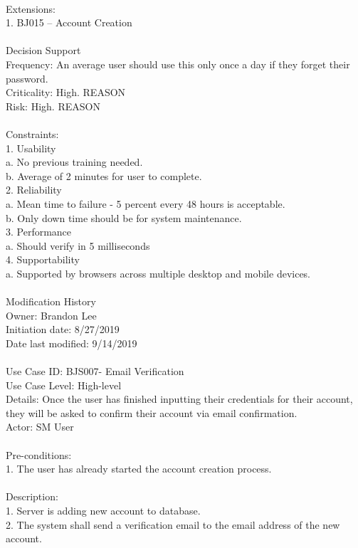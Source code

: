 \documentclass{report}
\begin{document}
\\
Extensions: \\
1.	BJ015 – Account Creation\\
\\
Decision Support\\
     Frequency: An average user should use this only once a day if they forget their password.\\
     Criticality: High. REASON\\
     Risk: High. REASON\\
\\
Constraints: \\
1.	Usability\\
a.	No previous training needed.\\
b.	Average of 2 minutes for user to complete.\\
2.	Reliability\\
a.	Mean time to failure - 5 percent every 48 hours is acceptable.\\
b.	Only down time should be for system maintenance.\\
3.	Performance\\
a.	Should verify in 5 milliseconds\\
4.	Supportability\\
a. 	Supported by browsers across multiple desktop and mobile devices.\\
\\
Modification History\\
     Owner: Brandon Lee\\
     Initiation date: 8/27/2019\\
     Date last modified: 9/14/2019\\
\\
Use Case ID: BJS007- Email Verification\\
Use Case Level: High-level\\
Details:  Once the user has finished inputting their credentials for their account, they will be asked to confirm their account via email confirmation.\\
Actor: SM User\\
\\
Pre-conditions: \\
1.	The user has already started the account creation process.\\
\\
Description: \\
1.	Server is adding new account to database.\\
2.	The system shall send a verification email to the email address of the new account.\\
\end{document}
